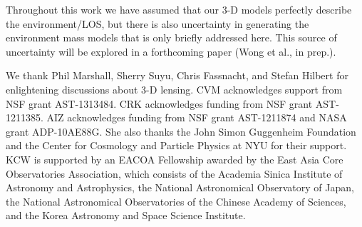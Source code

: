 \documentclass{emulateapj}
\begin{document}
Throughout this work we have assumed that our 3-D models perfectly describe the environment/LOS, but there is also uncertainty in generating the environment mass models that is only briefly addressed here. This source of uncertainty will be explored in a forthcoming paper (Wong et al., in prep.).

\acknowledgements
We thank Phil Marshall, Sherry Suyu, Chris Fassnacht, and Stefan Hilbert for enlightening discussions about 3-D lensing. CVM acknowledges support from NSF grant AST-1313484. CRK acknowledges funding from NSF grant AST-1211385. AIZ acknowledges funding from NSF grant AST-1211874 and NASA grant ADP-10AE88G. She also thanks the John Simon Guggenheim Foundation and the Center for Cosmology and Particle Physics at NYU for their support. KCW is supported by an EACOA Fellowship awarded by the East Asia Core Observatories Association, which consists of the Academia Sinica Institute of Astronomy and Astrophysics, the National Astronomical Observatory of Japan, the National Astronomical Observatories of the Chinese Academy of Sciences, and the Korea Astronomy and Space Science Institute.




\end{document}
